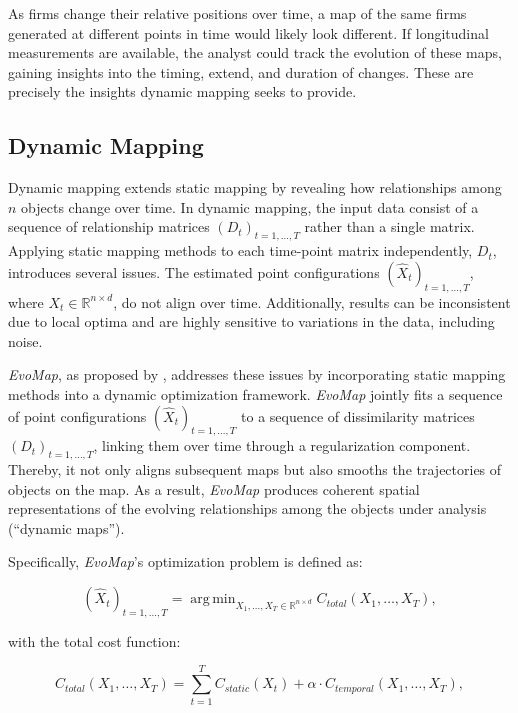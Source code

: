 \documentclass[article]{jss}
\DeclareMathOperator*{\argmin}{arg\,min}  %
\begin{document}
As firms change their relative positions over time, a map of the same firms generated 
at different points in time would likely look different. If longitudinal measurements are
available, the analyst could track the evolution of these maps, gaining insights into the timing, extend, and 
duration of changes. These are precisely the insights dynamic mapping seeks to provide.

\subsection{Dynamic Mapping} \label{sec:dynamic-mapping}

Dynamic mapping extends static mapping by revealing how relationships among $n$ objects change over time. 
In dynamic mapping, the input data consist of a sequence of relationship matrices $(D_t)_{t=1, \dots, T}$
 rather than a single matrix.  
Applying static mapping methods to each time-point matrix independently, $D_t$, introduces several issues. 
The estimated point configurations $(\hat{X}_t)_{t=1, \dots, T}$, where $X_t \in \mathbb{R}^{n \times d}$, do 
not align over time. Additionally, results can be inconsistent due to local optima and are highly sensitive to 
variations in the data, including noise.

\emph{EvoMap}, as proposed by \cite{Matthe+Ringel+Skiera:2023}, addresses these issues 
by incorporating static mapping methods into a dynamic optimization framework. 
\emph{EvoMap} jointly fits a sequence of point configurations $(\hat{X}_t)_{t=1,\dots,T}$
to a sequence of dissimilarity matrices $(D_t)_{t=1,\dots,T}$, linking them over time 
through a regularization component. Thereby, it not only aligns subsequent maps 
but also smooths the trajectories of objects on the map. As a result, 
 \emph{EvoMap} produces coherent spatial representations of the evolving relationships 
 among the objects under analysis (“dynamic maps”).

Specifically, \emph{EvoMap}’s optimization problem is defined as:

\begin{equation} \label{eq:evomap-optim}
  (\hat{X}_t)_{t=1,\ldots,T} = \argmin_{X_1, \ldots, X_T \in \mathbb{R}^{n \times d}} C_{total}(X_1, \ldots, X_T),
\end{equation}

with the total cost function:

\begin{equation} \label{eq:cost-total}
  C_{total}(X_1, \ldots, X_T) = \sum_{t=1}^T{C_{static}(X_t)} + \alpha \cdot C_{temporal}(X_1, \ldots, X_T),
\end{equation}
\end{document}
